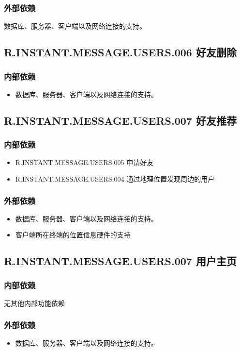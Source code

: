 \subsubsection{外部依赖}
数据库、服务器、客户端以及网络连接的支持。
{
    \color{red}
    \subsection{R.INSTANT.MESSAGE.USERS.006 好友删除}
    \subsubsection{内部依赖}
    \begin{itemize}
        \item 数据库、服务器、客户端以及网络连接的支持。
    \end{itemize}
    \subsection{R.INSTANT.MESSAGE.USERS.007 好友推荐}
    \subsubsection{内部依赖}
    \begin{itemize}
        \item R.INSTANT.MESSAGE.USERS.005 申请好友
        \item R.INSTANT.MESSAGE.USERS.004 通过地理位置发现周边的用户
    \end{itemize}
    \subsubsection{外部依赖}
    \begin{itemize}
        \item 数据库、服务器、客户端以及网络连接的支持。
        \item 客户端所在终端的位置信息硬件的支持
    \end{itemize}

    \subsection{R.INSTANT.MESSAGE.USERS.007 用户主页}
    \subsubsection{内部依赖}
    无其他内部功能依赖
    \subsubsection{外部依赖}
    \begin{itemize}
        \item 数据库、服务器、客户端以及网络连接的支持。
    \end{itemize}

}
